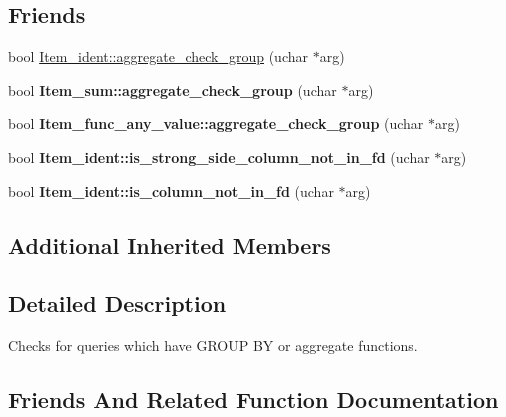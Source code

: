 \subsection*{Friends}
\begin{DoxyCompactItemize}
\item 
bool \mbox{\hyperlink{classGroup__check_a832ec3c3fec84508045c29d24da28364}{Item\+\_\+ident\+::aggregate\+\_\+check\+\_\+group}} (uchar $\ast$arg)
\item 
\mbox{\label{classGroup__check_af9558c5b2ed06aa53808f959c1620158}} 
bool {\bfseries Item\+\_\+sum\+::aggregate\+\_\+check\+\_\+group} (uchar $\ast$arg)
\item 
\mbox{\label{classGroup__check_a6b2515eace9ac4e4547fbae4f40afe99}} 
bool {\bfseries Item\+\_\+func\+\_\+any\+\_\+value\+::aggregate\+\_\+check\+\_\+group} (uchar $\ast$arg)
\item 
\mbox{\label{classGroup__check_afa660696dda5fec9df6dafd14aebce4d}} 
bool {\bfseries Item\+\_\+ident\+::is\+\_\+strong\+\_\+side\+\_\+column\+\_\+not\+\_\+in\+\_\+fd} (uchar $\ast$arg)
\item 
\mbox{\label{classGroup__check_a8aa8c21d7382ba634e7d252c2df84b9f}} 
bool {\bfseries Item\+\_\+ident\+::is\+\_\+column\+\_\+not\+\_\+in\+\_\+fd} (uchar $\ast$arg)
\end{DoxyCompactItemize}
\subsection*{Additional Inherited Members}


\subsection{Detailed Description}
Checks for queries which have G\+R\+O\+UP BY or aggregate functions. 

\subsection{Friends And Related Function Documentation}
\mbox{\label{classGroup__check_a832ec3c3fec84508045c29d24da28364}} 

